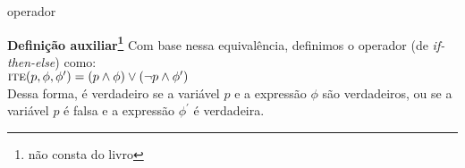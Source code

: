 \expandafter\documentclass\expandafter[table, usenames, svgnames, dvipsnames,14pt, \classopts]{beamer}
\begin{document}






























%
%
\iffalse
\begin{frame}{operador }

    \begin{block}{\textbf{Definição auxiliar\footnote{não consta do livro}}}
        Com base nessa equivalência, definimos o operador  (de \textit{if-then-else}) como:\\[1em]
        $\textproc{ite}(p,\phi,\phi^{\prime}) = (p \land \phi) \lor (\lnot{p} \land \phi^{\prime})$
        \\[1em]
        Dessa forma,  é verdadeiro se a variável $p$ e a expressão $\phi$ são verdadeiros, ou se a variável $p$ é falsa e a expressão $\phi^{\prime}$ é verdadeira.
    \end{block}

\end{frame}
\end{document}
